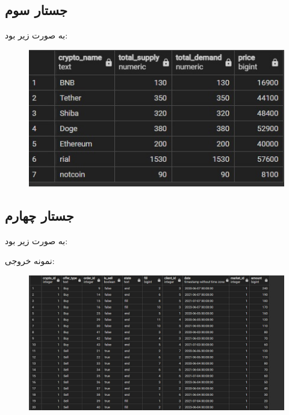 \documentclass{book}
\begin{document}
\subsection{جستار سوم}

به صورت زیر بود:

\begin{latin}
    \footnotesize

\end{latin}
\begin{figure}[h]
    \centering
    \includegraphics[width=0.6\linewidth]{sql-res/3.jpg}
\end{figure}


\subsection{جستار چهارم}

به صورت زیر بود:

\begin{latin}
    \footnotesize

\end{latin}

نمونه خروجی:

\begin{figure}[h]
    \centering
    \includegraphics[width=\linewidth]{sql-res/4.jpg}
\end{figure}
\end{document}

